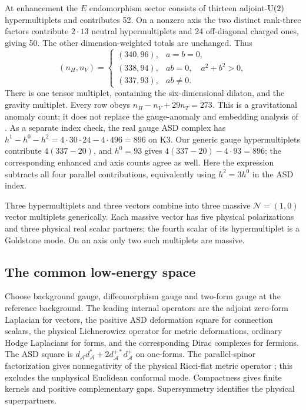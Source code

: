 At enhancement the $E$ endomorphism sector consists of thirteen
adjoint-$\operatorname{U}(2)$ hypermultiplets and contributes 52. On a nonzero axis
the two distinct rank-three factors contribute $2\cdot13$ neutral
hypermultiplets and 24 off-diagonal charged ones, giving 50.
The other dimension-weighted totals are unchanged. Thus
\begin{equation}\label{eq:counts}
 (n_H,n_V)=
 \begin{cases}
 (340,96),&a=b=0,\\
 (338,94),&ab=0,\quad a^2+b^2>0,\\
 (337,93),&ab\ne0.
 \end{cases}
\end{equation}
There is one tensor multiplet, containing the six-dimensional dilaton,
and the gravity multiplet. Every row obeys
$n_H-n_V+29n_T=273$. This is a gravitational anomaly count; it does
not replace the gauge-anomaly and embedding analysis of \cite{honecker}.
As a separate index check, the real gauge ASD complex has
$h^1-h^0-h^2=4\cdot30\cdot24-4\cdot496=896$ on K3. Our generic
gauge hypermultiplets contribute $4(337-20)$, and $h^0=93$ gives
$4(337-20)-4\cdot93=896$; the corresponding enhanced and axis
counts agree as well. Here the expression subtracts all four
parallel contributions, equivalently using $h^2=3h^0$ in the
ASD index.

Three hypermultiplets and three vectors combine into three massive
$\mathcal N=(1,0)$ vector multiplets generically. Each massive vector
has five physical polarizations and three physical real scalar
partners; the fourth scalar of its hypermultiplet is a Goldstone
mode. On an axis only two such multiplets are massive.

\subsection{The common low-energy space}
Choose background gauge, diffeomorphism gauge and two-form gauge at
the reference background. The leading internal operators are the
adjoint zero-form Laplacian for vectors, the positive ASD deformation
square for connection scalars, the physical Lichnerowicz operator for
metric deformations, ordinary Hodge Laplacians for forms, and the
corresponding Dirac complexes for fermions. The ASD square is
$d_{\mathcal A}d_{\mathcal A}^*+2d_{\mathcal A}^{+*}d_{\mathcal A}^+$
on one-forms. The parallel-spinor factorization gives nonnegativity
of the physical Ricci-flat metric operator \cite{parallelspinor};
this excludes the unphysical Euclidean conformal mode. Compactness
gives finite kernels and positive complementary gaps. Supersymmetry
identifies the physical superpartners.

